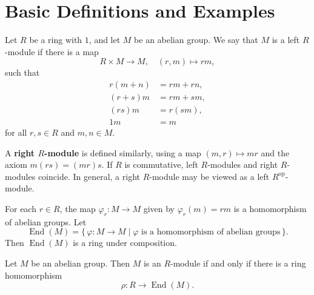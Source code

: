 \section{Basic Definitions and Examples}

\begin{definition}
    Let $R$ be a ring with $1$, and let $M$ be an abelian group. We say that $M$ is a left $R$-module if there is a map
    \[
        R \times M \to M, \quad (r, m) \mapsto rm,
    \]
    such that
    \[
        \begin{aligned}
            r(m+n) & = rm + rn, \\
            (r+s)m & = rm + sm, \\
            (rs)m  & = r(sm),   \\
            1m     & = m
        \end{aligned}
    \]
    for all $r, s \in R$ and $m, n \in M$.

    A \textbf{right $R$-module} is defined similarly, using a map $(m, r) \mapsto mr$ and the axiom $m(rs) = (mr)s$. If $R$ is commutative, left $R$-modules and right $R$-modules coincide. In general, a right $R$-module may be viewed as a left $R^{\mathrm{op}}$-module.
\end{definition}

For each $r \in R$, the map $\varphi_r\colon M \to M$ given by $\varphi_r(m) = rm$ is a homomorphism of abelian groups. Let
\[
    \operatorname{End}(M) = \{\, \varphi\colon M \to M \mid \varphi \text{ is a homomorphism of abelian groups} \,\}.
\]
Then $\operatorname{End}(M)$ is a ring under composition.

\begin{theorem}
    Let $M$ be an abelian group. Then $M$ is an $R$-module if and only if there is a ring homomorphism
    \[
        \rho\colon R \to \operatorname{End}(M).
    \]
\end{theorem}

